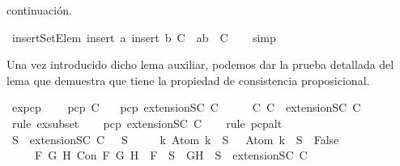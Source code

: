 \begin{isabellebody}
\begin{isamarkuptext}
  continuación.%
\end{isamarkuptext}\isamarkuptrue%
\isamarkupfalse%
\ insertSetElem{\isacharcolon}\ {\isachardoublequoteopen}insert\ a\ {\isacharparenleft}insert\ b\ C{\isacharparenright}\ {\isacharequal}\ {\isacharbraceleft}a{\isacharcomma}b{\isacharbraceright}\ {\isasymunion}\ C{\isachardoublequoteclose}\isanewline
%
\isadelimproof
\ \ %
\endisadelimproof
%
\isatagproof
{}\isamarkupfalse%
\ simp%
\endisatagproof
{\isafoldproof}%
%
\isadelimproof
%
\endisadelimproof
%
\begin{isamarkuptext}%
Una vez introducido dicho lema auxiliar, podemos dar la prueba detallada del lema que 
  demuestra que  tiene la propiedad de consistencia proposicional.%
\end{isamarkuptext}\isamarkuptrue%
\isamarkupfalse%
\ ex{}{\isacharunderscore}pcp{\isacharcolon}\ \isanewline
\ \ \ {\isachardoublequoteopen}pcp\ C{\isachardoublequoteclose}\isanewline
\ \ \ {\isachardoublequoteopen}pcp\ {\isacharparenleft}extensionSC\ C{\isacharparenright}{\isachardoublequoteclose}\isanewline
%
\isadelimproof
%
\endisadelimproof
%
\isatagproof
{}\isamarkupfalse%
\ {\isacharminus}\isanewline
\ \ \isamarkupfalse%
\ C{}{\isacharcolon}\ {\isachardoublequoteopen}C\ {\isasymsubseteq}\ {\isacharparenleft}extensionSC\ C{\isacharparenright}{\isachardoublequoteclose}\isanewline
\ \ \ \ \isamarkupfalse%
\ {\isacharparenleft}rule\ ex{}{\isacharunderscore}subset{\isacharparenright}\isanewline
\ \ \isamarkupfalse%
\ {\isachardoublequoteopen}pcp\ {\isacharparenleft}extensionSC\ C{\isacharparenright}{\isachardoublequoteclose}\isanewline
\ \ \isamarkupfalse%
\ {\isacharparenleft}rule\ pcp{\isacharunderscore}alt{}{\isacharparenright}\isanewline
\ \ \ \ \isamarkupfalse%
\ {\isachardoublequoteopen}{\isasymforall}S\ {\isasymin}\ {\isacharparenleft}extensionSC\ C{\isacharparenright}{\isachardot}\ {\isacharparenleft}{\isasymbottom}\ {\isasymnotin}\ S\isanewline
\ \ \ \ {\isasymand}\ {\isacharparenleft}{\isasymforall}k{\isachardot}\ Atom\ k\ {\isasymin}\ S\ {\isasymlongrightarrow}\ \isactrlbold {\isasymnot}\ {\isacharparenleft}Atom\ k{\isacharparenright}\ {\isasymin}\ S\ {\isasymlongrightarrow}\ False{\isacharparenright}\isanewline
\ \ \ \ {\isasymand}\ {\isacharparenleft}{\isasymforall}F\ G\ H{\isachardot}\ Con\ F\ G\ H\ {\isasymlongrightarrow}\ F\ {\isasymin}\ S\ {\isasymlongrightarrow}\ {\isacharbraceleft}G{\isacharcomma}H{\isacharbraceright}\ {\isasymunion}\ S\ {\isasymin}\ {\isacharparenleft}extensionSC\ C{\isacharparenright}{\isacharparenright}\isanewline

\end{isabellebody}
